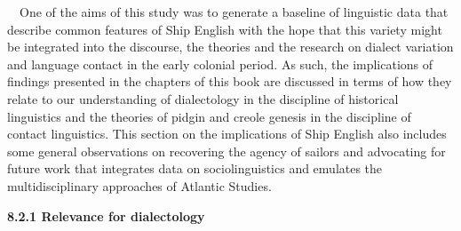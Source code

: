\begin{styleStandard}
\ \ One of the aims of this study was to generate a baseline of linguistic data that describe common features of Ship English with the hope that this variety might be integrated into the discourse, the theories and the research on dialect variation and language contact in the early colonial period. As such, the implications of findings presented in the chapters of this book are discussed in terms of how they relate to our understanding of dialectology in the discipline of historical linguistics and the theories of pidgin and creole genesis in the discipline of contact linguistics. This section on the implications of Ship English also includes some general observations on recovering the agency of sailors and advocating for future work that integrates data on sociolinguistics and emulates the multidisciplinary approaches of Atlantic Studies.
\end{styleStandard}


\begin{styleStandard}
\textbf{8.2.1 Relevance for dialectology}
\end{styleStandard}



